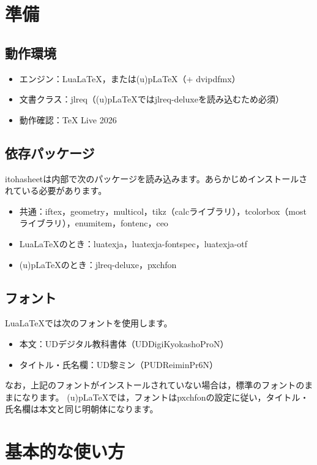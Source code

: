 \documentclass[fontsize=9pt]{jlreq}
\newcommand{\pkgname}{itohasheet}
\newcommand{\pkg}[1]{\textsf{#1}}
\begin{document}
\begin{分割}
\section{準備}
\subsection{動作環境}
\begin{itemize}
  \item エンジン：Lua\LaTeX{}，または(u)p\LaTeX{}（+ dvipdfmx）
  \item 文書クラス：\pkg{jlreq}（(u)p\LaTeX{}では\pkg{jlreq-deluxe}を読み込むため必須）
  \item 動作確認：TeX Live 2026
\end{itemize}

\subsection{依存パッケージ}
\pkg{\pkgname}は内部で次のパッケージを読み込みます。あらかじめインストールされている必要があります。
\begin{itemize}
  \item 共通：\pkg{iftex}，\pkg{geometry}，\pkg{multicol}，\pkg{tikz}（\pkg{calc}ライブラリ），\pkg{tcolorbox}（\pkg{most}ライブラリ），\pkg{enumitem}，\pkg{fontenc}，\pkg{ceo}
  \item Lua\LaTeX{}のとき：\pkg{luatexja}，\pkg{luatexja-fontspec}，\pkg{luatexja-otf}
  \item (u)p\LaTeX{}のとき：\pkg{jlreq-deluxe}，\pkg{pxchfon}
\end{itemize}

\subsection{フォント}
Lua\LaTeX{}では次のフォントを使用します。
\begin{itemize}
  \item 本文：UDデジタル教科書体（UDDigiKyokashoProN）
  \item タイトル・氏名欄：UD黎ミン（PUDReiminPr6N）
\end{itemize}
なお，上記のフォントがインストールされていない場合は，標準のフォントのままになります。
(u)p\LaTeX{}では，フォントは\pkg{pxchfon}の設定に従い，タイトル・氏名欄は本文と同じ明朝体になります。


\section{基本的な使い方}

\end{分割}
\end{document}
